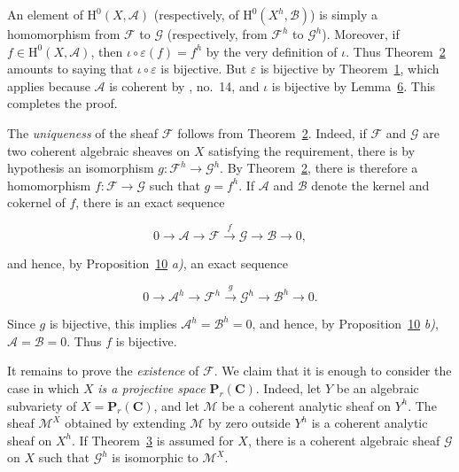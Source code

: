 An element of $\mathrm{H}^0(X,\mathcal{A})$ (respectively, of $\mathrm{H}^0(X^h,\mathcal{B})$) is simply a homomorphism from $\mathcal{F}$ to $\mathcal{G}$ (respectively, from $\mathcal{F}^h$ to $\mathcal{G}^h$). Moreover, if $f\in\mathrm{H}^0(X,\mathcal{A})$, then $\iota\circ\varepsilon(f)=f^h$ by the very definition of $\iota$. Thus Theorem~\hyperref[gaga:thm:2]{2} amounts to saying that $\iota\circ\varepsilon$ is bijective. But $\varepsilon$ is bijective by Theorem~\hyperref[gaga:thm:1]{1}, which applies because $\mathcal{A}$ is coherent by , no.~14, and $\iota$ is bijective by Lemma~\hyperref[gaga:lemma:6]{6}. This completes the proof.


The \emph{uniqueness} of the sheaf $\mathcal{F}$ follows from Theorem~\hyperref[gaga:thm:2]{2}. Indeed, if $\mathcal{F}$ and $\mathcal{G}$ are two coherent algebraic sheaves on $X$ satisfying the requirement, there is by hypothesis an isomorphism $g:\mathcal{F}^h\to\mathcal{G}^h$. By Theorem~\hyperref[gaga:thm:2]{2}, there is therefore a homomorphism $f:\mathcal{F}\to\mathcal{G}$ such that $g=f^h$. If $\mathcal{A}$ and $\mathcal{B}$ denote the kernel and cokernel of $f$, there is an exact sequence

\begin{equation*}
0\longrightarrow\mathcal{A}\longrightarrow\mathcal{F}
\xrightarrow{f}\mathcal{G}\longrightarrow\mathcal{B}\longrightarrow0,
\end{equation*}

and hence, by Proposition~\hyperref[gaga:prop:10]{10} \emph{a)}, an exact sequence

\begin{equation*}
0\longrightarrow\mathcal{A}^h\longrightarrow\mathcal{F}^h
\xrightarrow{g}\mathcal{G}^h\longrightarrow\mathcal{B}^h\longrightarrow0.
\end{equation*}

Since $g$ is bijective, this implies $\mathcal{A}^h=\mathcal{B}^h=0$, and hence, by Proposition~\hyperref[gaga:prop:10]{10} \emph{b)}, $\mathcal{A}=\mathcal{B}=0$. Thus $f$ is bijective.

It remains to prove the \emph{existence} of $\mathcal{F}$. We claim that it is enough to consider the case in which $X$ \emph{is a projective space} $\mathbf{P}_r(\mathbf{C})$. Indeed, let $Y$ be an algebraic subvariety of $X=\mathbf{P}_r(\mathbf{C})$, and let $\mathcal{M}$ be a coherent analytic sheaf on $Y^h$. The sheaf $\mathcal{M}^X$ obtained by extending $\mathcal{M}$ by zero outside $Y^h$ is a coherent analytic sheaf on $X^h$. If Theorem~\hyperref[gaga:thm:3]{3} is assumed for $X$, there is a coherent algebraic sheaf $\mathcal{G}$ on $X$ such that $\mathcal{G}^h$ is isomorphic to $\mathcal{M}^X$.


